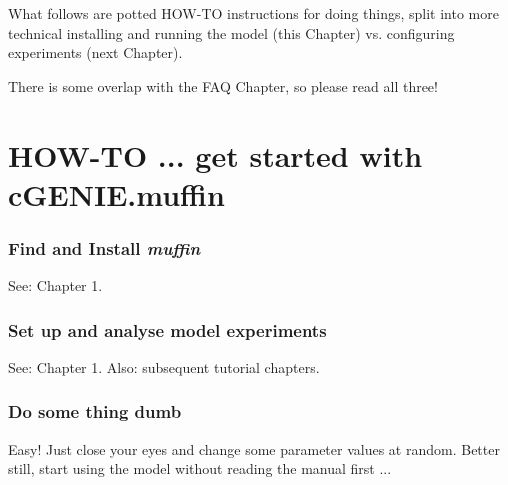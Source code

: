\documentclass[11pt,fleqn]{book} %
\begin{document}
\hfill \break
\vspace{24mm}

\Large
What follows are potted HOW-TO instructions for doing things, split into more technical installing and running the model (this Chapter) vs. configuring experiments (next Chapter).
\vspace{2mm}

There is some overlap with the FAQ Chapter, so please read all three!
\normalsize


\newpage


\section{HOW-TO ... get started with cGENIE.muffin}\label{how-to-0}
\vspace{2mm}

%
\subsubsection{Find and Install \textbf{\textit{muffin}}}\label{install-muffin}

\vspace{1mm}
See: Chapter 1.

%
\subsubsection{Set up and analyse model experiments}

\vspace{1mm}
See: Chapter 1.
\noindent Also: subsequent tutorial chapters.

%
\subsubsection{Do some thing dumb}\label{Do some thing dumb}

\vspace{1mm}
Easy! Just close your eyes and change some parameter values at random. Better still, start using the model without reading the manual first ...

\end{document}
